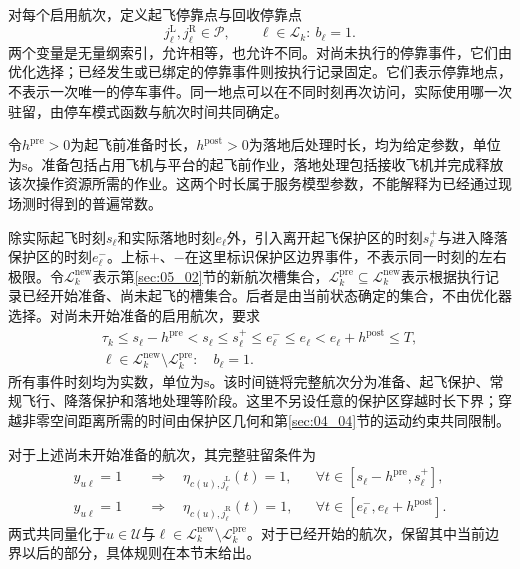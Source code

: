 对每个启用航次，定义起飞停靠点与回收停靠点
\begin{equation}
 j_\ell^{\mathrm L},j_\ell^{\mathrm R}\in\mathcal P,
 \qquad \ell\in\mathcal L_k:\ b_\ell=1.
 \label{s0504:parking_choices}
\end{equation}
两个变量是无量纲索引，允许相等，也允许不同。对尚未执行的停靠事件，它们由优化选择；已经发生或已绑定的停靠事件则按执行记录固定。它们表示停靠地点，不表示一次唯一的停车事件。同一地点可以在不同时刻再次访问，实际使用哪一次驻留，由停车模式函数与航次时间共同确定。

令$h^{\mathrm{pre}}>0$为起飞前准备时长，$h^{\mathrm{post}}>0$为落地后处理时长，均为给定参数，单位为$\mathrm{s}$。准备包括占用飞机与平台的起飞前作业，落地处理包括接收飞机并完成释放该次操作资源所需的作业。这两个时长属于服务模型参数，不能解释为已经通过现场测时得到的普遍常数。

除实际起飞时刻$s_\ell$和实际落地时刻$e_\ell$外，引入离开起飞保护区的时刻$s_\ell^+$与进入降落保护区的时刻$e_\ell^-$。上标$+$、$-$在这里标识保护区边界事件，不表示同一时刻的左右极限。令$\mathcal L_k^{\mathrm{new}}$表示第\ref{sec:05_02}节的新航次槽集合，$\mathcal L_k^{\mathrm{pre}}\subseteq\mathcal L_k^{\mathrm{new}}$表示根据执行记录已经开始准备、尚未起飞的槽集合。后者是由当前状态确定的集合，不由优化器选择。对尚未开始准备的启用航次，要求
\begin{equation}
 \begin{gathered}
 \tau_k\le s_\ell-h^{\mathrm{pre}}
 <s_\ell\le s_\ell^+\le e_\ell^-\le e_\ell
 <e_\ell+h^{\mathrm{post}}\le T,\\
 \ell\in\mathcal L_k^{\mathrm{new}}\setminus\mathcal L_k^{\mathrm{pre}}:
 \quad b_\ell=1.
 \end{gathered}
 \label{s0504:complete_time_order}
\end{equation}
所有事件时刻均为实数，单位为$\mathrm{s}$。该时间链将完整航次分为准备、起飞保护、常规飞行、降落保护和落地处理等阶段。这里不另设任意的保护区穿越时长下界；穿越非零空间距离所需的时间由保护区几何和第\ref{sec:04_04}节的运动约束共同限制。

对于上述尚未开始准备的航次，其完整驻留条件为
\begin{align}
 y_{u\ell}=1\quad&\Longrightarrow\quad
 \eta_{c(u),j_\ell^{\mathrm L}}(t)=1,
 &&\forall t\in[s_\ell-h^{\mathrm{pre}},s_\ell^+],
 \label{s0504:launch_dwell}\\
 y_{u\ell}=1\quad&\Longrightarrow\quad
 \eta_{c(u),j_\ell^{\mathrm R}}(t)=1,
 &&\forall t\in[e_\ell^-,e_\ell+h^{\mathrm{post}}].
 \label{s0504:recovery_dwell}
\end{align}
两式共同量化于$u\in\mathcal U$与$\ell\in\mathcal L_k^{\mathrm{new}}\setminus\mathcal L_k^{\mathrm{pre}}$。对于已经开始的航次，保留其中当前边界以后的部分，具体规则在本节末给出。

